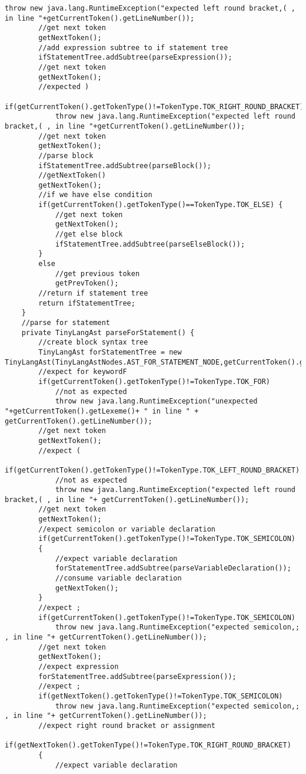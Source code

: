 \begin{lstlisting}[basicstyle=\miniscule,caption=Implementation of recursive descent parser,label=listing:rescursive descent parser implementation]
			throw new java.lang.RuntimeException("expected left round bracket,( , in line "+getCurrentToken().getLineNumber());
		//get next token
		getNextToken();
		//add expression subtree to if statement tree
		ifStatementTree.addSubtree(parseExpression());
		//get next token
		getNextToken();
		//expected )
		if(getCurrentToken().getTokenType()!=TokenType.TOK_RIGHT_ROUND_BRACKET)
			throw new java.lang.RuntimeException("expected left round bracket,( , in line "+getCurrentToken().getLineNumber());
		//get next token
		getNextToken();
		//parse block
		ifStatementTree.addSubtree(parseBlock());
		//getNextToken()
		getNextToken();
		//if we have else condition
		if(getCurrentToken().getTokenType()==TokenType.TOK_ELSE) {
			//get next token
			getNextToken();
			//get else block
			ifStatementTree.addSubtree(parseElseBlock());
		}
		else 
			//get previous token
			getPrevToken();
		//return if statement tree
		return ifStatementTree;
	}
	//parse for statement
	private TinyLangAst parseForStatement() {
		//create block syntax tree
		TinyLangAst forStatementTree = new TinyLangAst(TinyLangAstNodes.AST_FOR_STATEMENT_NODE,getCurrentToken().getLineNumber());
		//expect for keywordF
		if(getCurrentToken().getTokenType()!=TokenType.TOK_FOR)
			//not as expected
			throw new java.lang.RuntimeException("unexpected "+getCurrentToken().getLexeme()+ " in line " + getCurrentToken().getLineNumber());
		//get next token
		getNextToken();
		//expect (
		if(getCurrentToken().getTokenType()!=TokenType.TOK_LEFT_ROUND_BRACKET)
			//not as expected
			throw new java.lang.RuntimeException("expected left round bracket,( , in line "+ getCurrentToken().getLineNumber());
		//get next token
		getNextToken();
		//expect semicolon or variable declaration
		if(getCurrentToken().getTokenType()!=TokenType.TOK_SEMICOLON)
		{
			//expect variable declaration
			forStatementTree.addSubtree(parseVariableDeclaration());
			//consume variable declaration 
			getNextToken();
		}
		//expect ;
		if(getCurrentToken().getTokenType()!=TokenType.TOK_SEMICOLON)		
			throw new java.lang.RuntimeException("expected semicolon,; , in line "+ getCurrentToken().getLineNumber());
		//get next token 
		getNextToken();
		//expect expression
		forStatementTree.addSubtree(parseExpression());
		//expect ;
		if(getNextToken().getTokenType()!=TokenType.TOK_SEMICOLON)		
			throw new java.lang.RuntimeException("expected semicolon,; , in line "+ getCurrentToken().getLineNumber());
		//expect right round bracket or assignment
		if(getNextToken().getTokenType()!=TokenType.TOK_RIGHT_ROUND_BRACKET)
		{
			//expect variable declaration

\end{lstlisting}

